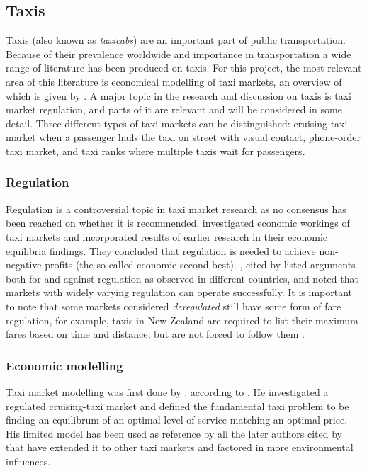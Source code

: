 \subsection{Taxis}
\label{sec:literature:taxis}

Taxis (also known as \textit{taxicabs}) are an important part of public
transportation. Because of their prevalence worldwide and importance in
transportation a wide range of literature has been produced on taxis. For this
project, the most relevant area of this literature is economical modelling of
taxi markets, an overview of which is given by
\textcite{Salanova2011taxi+review}. A major topic in the research and
discussion on taxis is taxi market regulation, and parts of it are relevant and
will be considered in some detail. Three different types of taxi markets can be
distinguished: cruising taxi market when a passenger hails the taxi on street
with visual contact, phone-order taxi market, and taxi ranks where multiple
taxis wait for passengers.


\subsubsection{Regulation}

Regulation is a controversial topic in taxi market research as no consensus has
been reached on whether it is recommended.
\textcite{Cairns1996taxi+competition} investigated economic workings of taxi
markets and incorporated results of earlier research in their economic
equilibria findings. They concluded that regulation is needed to achieve non-
negative profits (the so-called economic second best).
\textcite{Oecd2007taxi+policy}, cited by \textcite{Salanova2011taxi+review}
listed arguments both for and against regulation as observed in different
countries, and noted that markets with widely varying regulation can operate
successfully. It is important to note that some markets considered
\textit{deregulated} still have some form of fare regulation, for example,
taxis in New Zealand are required to list their maximum fares based on time and
distance, but are not forced to follow them
\parencite{Gaunt1995taxi+newzealand}.


\subsubsection{Economic modelling} 
\label{sec:literature:taxis:modelling}

Taxi market modelling was first done by \textcite{Douglas1972taxi+regulation},
according to \textcite{Salanova2011taxi+review}. He investigated a regulated
cruising-taxi market and defined the fundamental taxi problem to be finding an
equilibrum of an optimal level of service matching an optimal price. His
limited model has been used as reference by all the later authors cited by
\textcite{Salanova2011taxi+review} that have extended it to other taxi markets
and factored in more environmental influences.

